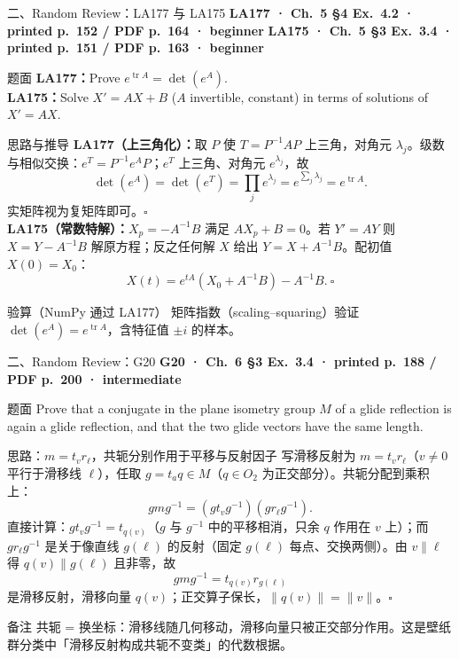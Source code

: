 \documentclass[aspectratio=169,10pt,fontset=none]{ctexbeamer}
\newcommand{\ex}[1]{\textcolor{accent}{\footnotesize\bfseries #1}}
\begin{document}
\begin{frame}[t]{二、Random Review：LA177 与 LA175}
  \leavevmode\ex{LA177 · Ch.~5 §4 Ex.~4.2 · printed p.~152 / PDF p.~164 · beginner}\quad
  \ex{LA175 · Ch.~5 §3 Ex.~3.4 · printed p.~151 / PDF p.~163 · beginner}
  \begin{block}{\footnotesize 题面}
    \scriptsize \textbf{LA177：}Prove $e^{\operatorname{tr}A}=\det(e^A)$.\\
    \textbf{LA175：}Solve $X'=AX+B$ ($A$ invertible, constant) in terms of solutions of $X'=AX$.
  \end{block}
  \begin{exampleblock}{\footnotesize 思路与推导}
    \scriptsize
    \textbf{LA177（上三角化）：}取 $P$ 使 $T=P^{-1}AP$ 上三角，对角元 $\lambda_j$。级数与相似交换：$e^T=P^{-1}e^AP$；$e^T$ 上三角、对角元 $e^{\lambda_j}$，故
    $$\det(e^A)=\det(e^T)=\prod_je^{\lambda_j}=e^{\sum_j\lambda_j}=e^{\operatorname{tr}A}.$$
    实矩阵视为复矩阵即可。$\square$\\[2pt]
    \textbf{LA175（常数特解）：}$X_p=-A^{-1}B$ 满足 $AX_p+B=0$。若 $Y'=AY$ 则 $X=Y-A^{-1}B$ 解原方程；反之任何解 $X$ 给出 $Y=X+A^{-1}B$。配初值 $X(0)=X_0$：
    $$X(t)=e^{tA}(X_0+A^{-1}B)-A^{-1}B.\ \square$$
  \end{exampleblock}
  \begin{block}{\footnotesize 验算（NumPy 通过 LA177）}
    \scriptsize 矩阵指数（scaling--squaring）验证 $\det(e^A)=e^{\operatorname{tr}A}$，含特征值 $\pm i$ 的样本。
  \end{block}
\end{frame}

\begin{frame}[t]{二、Random Review：G20}
  \leavevmode\ex{G20 · Ch.~6 §3 Ex.~3.4 · printed p.~188 / PDF p.~200 · intermediate}
  \begin{block}{\footnotesize 题面}
    \scriptsize Prove that a conjugate in the plane isometry group $M$ of a glide reflection is again a glide reflection, and that the two glide vectors have the same length.
  \end{block}
  \begin{exampleblock}{\footnotesize 思路：$m=t_vr_\ell$，共轭分别作用于平移与反射因子}
    \scriptsize
    写滑移反射为 $m=t_vr_\ell$（$v\ne0$ 平行于滑移线 $\ell$），任取 $g=t_aq\in M$（$q\in O_2$ 为正交部分）。共轭分配到乘积上：
    $$gmg^{-1}=(gt_vg^{-1})(gr_\ell g^{-1}).$$
    直接计算：$gt_vg^{-1}=t_{q(v)}$（$g$ 与 $g^{-1}$ 中的平移相消，只余 $q$ 作用在 $v$ 上）；而 $gr_\ell g^{-1}$ 是关于像直线 $g(\ell)$ 的反射（固定 $g(\ell)$ 每点、交换两侧）。由 $v\parallel\ell$ 得 $q(v)\parallel g(\ell)$ 且非零，故
    $$gmg^{-1}=t_{q(v)}r_{g(\ell)}$$
    是滑移反射，滑移向量 $q(v)$；正交算子保长，$\lVert q(v)\rVert=\lVert v\rVert$。$\square$
  \end{exampleblock}
  \begin{block}{\footnotesize 备注}
    \scriptsize 共轭 = 换坐标：滑移线随几何移动，滑移向量只被正交部分作用。这是壁纸群分类中「滑移反射构成共轭不变类」的代数根据。
  \end{block}
\end{frame}
\end{document}
